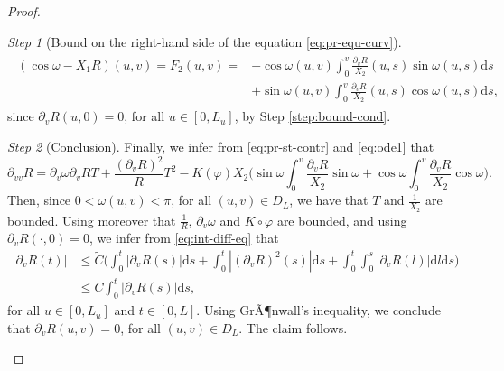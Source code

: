 \documentclass{article}
\newcommand{\DVV}{\partial_{vv}}
\newcommand{\DV}{\partial_{v}}
\newcommand{\ds}{\mathrm{d}s}
\newcommand{\dl}{\mathrm{d}l}
\theoremstyle{remark}
\theoremstyle{prpart}
\newtheorem{proofpart}{Step}
\begin{document}
\begin{proof}
\begin{proofpart}[Bound on the right-hand side of the equation \eqref{eq:pr-equ-curv}]
\begin{subequations}
\begin{align}
\begin{split}
(\cos \omega - X_1R)(u,v) = F_2(u,v) =& -\cos \omega(u,v)\int_0^v\frac{\DV R}{X_2}(u,s)\sin\omega(u,s)\ds\\
&+\sin\omega(u,v)\int_0^v\frac{\DV R}{X_2}(u,s)\cos\omega(u,s)\ds,
\end{split}
\end{align}
\end{subequations}
since $\DV R(u,0) = 0$, for all $u\in[0,L_u]$, by Step \ref{step:bound-cond}.
\end{proofpart}
\begin{proofpart}[Conclusion]\label{step:concl}
Finally, we infer from \eqref{eq:pr-st-contr} and \eqref{eq:ode1} that
\begin{equation}\label{eq:int-diff-eq}
\DVV R =\DV\omega\DV RT  + \frac{(\DV R)^2}{R}T^2 -K(\varphi)X_2\Big(\sin\omega\int_0^v\frac{\DV R}{X_2}\sin\omega
+\cos\omega\int_0^v\frac{\DV R}{X_2}\cos\omega\Big).
\end{equation}
Then, since $0<\omega(u,v)<\pi$, for all $(u,v)\in D_L$, we have that $T$ and $\frac{1}{X_2}$ are bounded. Using moreover that $\frac{1}{R}$, $\DV\omega$ and $K\circ\varphi$ are bounded, and using $\DV R(\cdot,0) = 0$, we infer from \eqref{eq:int-diff-eq} that
\begin{align*}
|\DV R(t)| &\leq \tilde C\Big( \int_0^t|\DV R(s)|\ds + \int_0^t|(\DV R)^2(s)|\ds + \int_0^t\int_0^s|\DV R(l)|\dl \ds\Big)\\
&\leq C\int_0^t|\DV R(s)|\ds,
\end{align*}
for all $u\in[0,L_u]$ and $t\in[0,L]$. Using GrÃ¶nwall's inequality, we conclude that $\DV R(u,v) = 0$, for all $(u,v)\in D_L$. The claim follows.
\end{proofpart}
\end{proof}
\end{document}
